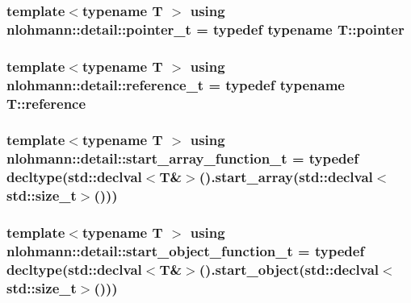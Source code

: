 \subsubsection[{\texorpdfstring{pointer\+\_\+t}{pointer_t}}]{\setlength{\rightskip}{0pt plus 5cm}template$<$typename T $>$ using {\bf nlohmann\+::detail\+::pointer\+\_\+t} = typedef typename T\+::pointer}\hypertarget{namespacenlohmann_1_1detail_a26dc71e2dd9336587e56062178f9abce}{}\label{namespacenlohmann_1_1detail_a26dc71e2dd9336587e56062178f9abce}
\subsubsection[{\texorpdfstring{reference\+\_\+t}{reference_t}}]{\setlength{\rightskip}{0pt plus 5cm}template$<$typename T $>$ using {\bf nlohmann\+::detail\+::reference\+\_\+t} = typedef typename T\+::reference}\hypertarget{namespacenlohmann_1_1detail_a082bdafd3b4c61d9d1e92b35b8f75ee3}{}\label{namespacenlohmann_1_1detail_a082bdafd3b4c61d9d1e92b35b8f75ee3}
\subsubsection[{\texorpdfstring{start\+\_\+array\+\_\+function\+\_\+t}{start_array_function_t}}]{\setlength{\rightskip}{0pt plus 5cm}template$<$typename T $>$ using {\bf nlohmann\+::detail\+::start\+\_\+array\+\_\+function\+\_\+t} = typedef decltype(std\+::declval$<$T\&$>$().start\+\_\+array(std\+::declval$<$std\+::size\+\_\+t$>$()))}\hypertarget{namespacenlohmann_1_1detail_a80273cecc45765d7b2826ec931fbffdd}{}\label{namespacenlohmann_1_1detail_a80273cecc45765d7b2826ec931fbffdd}
\subsubsection[{\texorpdfstring{start\+\_\+object\+\_\+function\+\_\+t}{start_object_function_t}}]{\setlength{\rightskip}{0pt plus 5cm}template$<$typename T $>$ using {\bf nlohmann\+::detail\+::start\+\_\+object\+\_\+function\+\_\+t} = typedef decltype(std\+::declval$<$T\&$>$().start\+\_\+object(std\+::declval$<$std\+::size\+\_\+t$>$()))}\hypertarget{namespacenlohmann_1_1detail_a5fff1e6dcaabd367d9b1109a5682f9d4}{}\label{namespacenlohmann_1_1detail_a5fff1e6dcaabd367d9b1109a5682f9d4}
